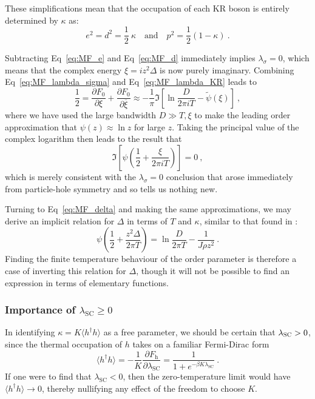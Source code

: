 
These simplifications mean that the occupation of each KR boson is entirely determined by $ \kappa $ as:
\begin{equation}
e^2 = d^2 = \frac{1}{2} ~ \kappa \quad \text{and} \quad p^2 = \frac{1}{2} (1 - \kappa) ~ .
\label{eq:soln_KR}
\end{equation}

Subtracting Eq~\eqref{eq:MF_e} and Eq~\eqref{eq:MF_d} immediately implies $ \lambda_{\sigma} = 0 $, which means that the complex energy $ \xi = i z^2 \Delta $ is now purely imaginary. Combining Eq~\eqref{eq:MF_lambda_sigma} and Eq~\eqref{eq:MF_lambda_KR} leads to $$ \frac{1}{2} = \frac{\partial F_0}{\partial \xi} + \frac{\partial F_0}{\partial \overline{\xi}} \approx - \frac{1}{\pi} \Im{\left[ \ln{\frac{D}{2 \pi i T}} - \widetilde{\psi}(\xi) \right]} ~ , $$ where we have used the large bandwidth $ D \gg T, \xi $ to make the leading order approximation that $ \psi(z) \approx \ln{z} $ for large $ z $. Taking the principal value of the complex logarithm then leads to the result that $$ \Im{\left[ \psi \left( \frac{1}{2} + \frac{\xi}{2 \pi i T} \right) \right] = 0} ~ , $$ which is merely consistent with the $ \lambda_{\sigma} = 0 $ conclusion that arose immediately from particle-hole symmetry and so tells us nothing new.

Turning to Eq~\eqref{eq:MF_delta} and making the same approximations, we may derive an implicit relation for $ \Delta $ in terms of $ T $ and $ \kappa $, similar to that found in \cite{ManyBodyPhysics}:
\begin{equation}
\psi \left( \frac{1}{2} + \frac{z^2 \Delta}{2 \pi T} \right) = \ln{\frac{D}{2 \pi T}} - \frac{1}{J \rho z^2} ~ .
\label{eq:soln_delta}
\end{equation}
Finding the finite temperature behaviour of the order parameter is therefore a case of inverting this relation for $ \Delta $, though it will not be possible to find an expression in terms of elementary functions. %

\subsubsection{Importance of $ \lambda_{\text{SC}} \geq 0 $}

In identifying $ \kappa = K \langle h^{\dagger} h \rangle $ as a free parameter, we should be certain that $ \lambda_{\textsc{SC}} > 0 $, since the thermal occupation of $ h $ takes on a familiar Fermi-Dirac form $$ \langle h^{\dagger} h \rangle = - \frac{1}{K} \frac{\partial F_{\text{h}}}{\partial \lambda_{\text{SC}}} = \frac{1}{1 + e^{- \beta K \lambda_{\text{SC}}}} ~. $$ If one were to find that $ \lambda_{\text{SC}} < 0 $, then the zero-temperature limit would have $ \langle h^{\dagger} h \rangle \rightarrow 0 $, thereby nullifying any effect of the freedom to choose $ K $.

